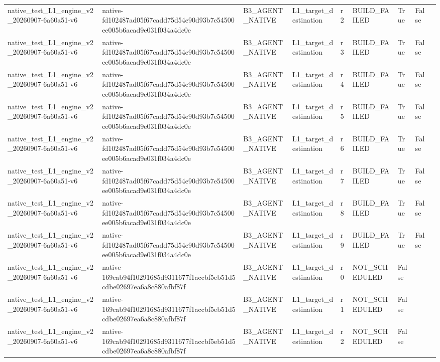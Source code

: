 \begin{tabular}{lllllllll}
native\_test\_L1\_engine\_v2\_20260907-6a60a51-v6 & native-fd102487ad05f67cadd75d54e90d93b7e54500ee005b6acad9e031f034a4dc0e & B3\_AGENT\_NATIVE & L1\_target\_destination & r2 & BUILD\_FAILED & True & False &  \\
native\_test\_L1\_engine\_v2\_20260907-6a60a51-v6 & native-fd102487ad05f67cadd75d54e90d93b7e54500ee005b6acad9e031f034a4dc0e & B3\_AGENT\_NATIVE & L1\_target\_destination & r3 & BUILD\_FAILED & True & False &  \\
native\_test\_L1\_engine\_v2\_20260907-6a60a51-v6 & native-fd102487ad05f67cadd75d54e90d93b7e54500ee005b6acad9e031f034a4dc0e & B3\_AGENT\_NATIVE & L1\_target\_destination & r4 & BUILD\_FAILED & True & False &  \\
native\_test\_L1\_engine\_v2\_20260907-6a60a51-v6 & native-fd102487ad05f67cadd75d54e90d93b7e54500ee005b6acad9e031f034a4dc0e & B3\_AGENT\_NATIVE & L1\_target\_destination & r5 & BUILD\_FAILED & True & False &  \\
native\_test\_L1\_engine\_v2\_20260907-6a60a51-v6 & native-fd102487ad05f67cadd75d54e90d93b7e54500ee005b6acad9e031f034a4dc0e & B3\_AGENT\_NATIVE & L1\_target\_destination & r6 & BUILD\_FAILED & True & False &  \\
native\_test\_L1\_engine\_v2\_20260907-6a60a51-v6 & native-fd102487ad05f67cadd75d54e90d93b7e54500ee005b6acad9e031f034a4dc0e & B3\_AGENT\_NATIVE & L1\_target\_destination & r7 & BUILD\_FAILED & True & False &  \\
native\_test\_L1\_engine\_v2\_20260907-6a60a51-v6 & native-fd102487ad05f67cadd75d54e90d93b7e54500ee005b6acad9e031f034a4dc0e & B3\_AGENT\_NATIVE & L1\_target\_destination & r8 & BUILD\_FAILED & True & False &  \\
native\_test\_L1\_engine\_v2\_20260907-6a60a51-v6 & native-fd102487ad05f67cadd75d54e90d93b7e54500ee005b6acad9e031f034a4dc0e & B3\_AGENT\_NATIVE & L1\_target\_destination & r9 & BUILD\_FAILED & True & False &  \\
native\_test\_L1\_engine\_v2\_20260907-6a60a51-v6 & native-169cab94f10291685d9311677f1accbf5eb51d5cdbe02697ea6a8c880afbf87f & B3\_AGENT\_NATIVE & L1\_target\_destination & r0 & NOT\_SCHEDULED & False &  &  \\
native\_test\_L1\_engine\_v2\_20260907-6a60a51-v6 & native-169cab94f10291685d9311677f1accbf5eb51d5cdbe02697ea6a8c880afbf87f & B3\_AGENT\_NATIVE & L1\_target\_destination & r1 & NOT\_SCHEDULED & False &  &  \\
native\_test\_L1\_engine\_v2\_20260907-6a60a51-v6 & native-169cab94f10291685d9311677f1accbf5eb51d5cdbe02697ea6a8c880afbf87f & B3\_AGENT\_NATIVE & L1\_target\_destination & r2 & NOT\_SCHEDULED & False &  &  \\

\end{tabular}
